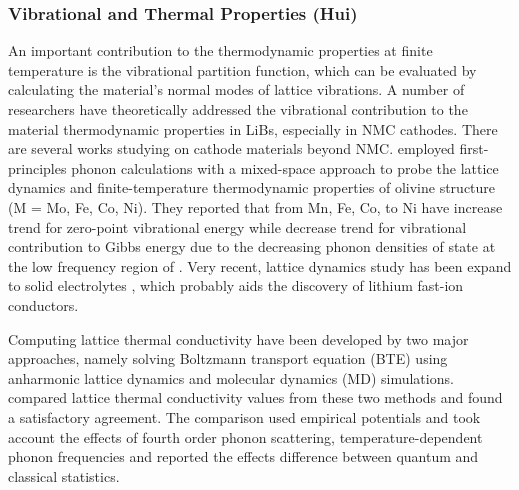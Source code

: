 \documentclass[../main.tex]{subfiles}
\begin{document}
\subsubsection{Vibrational and Thermal Properties (Hui)}
An important contribution to the thermodynamic properties at finite temperature is the vibrational partition function, which can be evaluated by calculating the material’s normal modes of lattice vibrations. A number of researchers have theoretically addressed the vibrational contribution to the material thermodynamic properties in LiBs, especially in NMC cathodes. \cite{du2016insight,yang2019highly,yang2020chemical} There are several works studying on cathode materials beyond NMC. \citeauthor{shang2012lattice} employed first-principles phonon calculations with a mixed-space approach to probe the lattice dynamics and finite-temperature thermodynamic properties of olivine structure  (M = Mo, Fe, Co, Ni).\cite{shang2012lattice} They reported that  from Mn, Fe, Co, to Ni have increase trend for zero-point vibrational energy while decrease trend for vibrational contribution to Gibbs energy due to the decreasing phonon densities of state at the low frequency region of .
Very recent, lattice dynamics study has been expand to solid electrolytes , which probably aids the discovery of lithium fast-ion conductors. \cite{sagotra2019influence} 

Computing lattice thermal conductivity have been developed by two major approaches, namely  solving Boltzmann transport equation (BTE) using anharmonic lattice dynamics and molecular dynamics (MD) simulations. \citeauthor{puligheddu2019computational} compared lattice thermal conductivity values from these two methods and found a satisfactory agreement.\cite{puligheddu2019computational} The comparison used empirical potentials and took account the effects of fourth order phonon scattering, temperature-dependent phonon frequencies and reported the effects difference between quantum and classical statistics.
\end{document}
